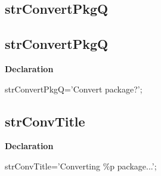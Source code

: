 \documentclass{report}
\newif\ifpdf
\begin{document}
\subsection*{\large{\textbf{strConvertPkgQ}}\normalsize\hspace{1ex}\hrulefill}
\else
\subsection*{strConvertPkgQ}
\fi
\label{trstrings-strConvertPkgQ}
\begin{list}{}{
\setlength{\itemindent}{0cm}
\setlength{\listparindent}{0cm}
\setlength{\leftmargin}{\evensidemargin}
\addtolength{\leftmargin}{\tmplength}
\settowidth{\labelsep}{X}
\addtolength{\leftmargin}{\labelsep}
\setlength{\labelwidth}{\tmplength}
}
\item[\textbf{Declaration}\hfill]
\ifpdf
\begin{flushleft}
\fi
\begin{ttfamily}
strConvertPkgQ='Convert package?';\end{ttfamily}

\ifpdf
\end{flushleft}
\fi

\end{list}
\ifpdf
\subsection*{\large{\textbf{strConvTitle}}\normalsize\hspace{1ex}\hrulefill}
\else
\subsection*{strConvTitle}
\fi
\label{trstrings-strConvTitle}
\begin{list}{}{
\setlength{\itemindent}{0cm}
\setlength{\listparindent}{0cm}
\setlength{\leftmargin}{\evensidemargin}
\addtolength{\leftmargin}{\tmplength}
\settowidth{\labelsep}{X}
\addtolength{\leftmargin}{\labelsep}
\setlength{\labelwidth}{\tmplength}
}
\item[\textbf{Declaration}\hfill]
\ifpdf
\begin{flushleft}
\fi
\begin{ttfamily}
strConvTitle='Converting {\%}p package...';\end{ttfamily}

\ifpdf
\end{flushleft}
\fi

\end{list}
\ifpdf
\end{document}
